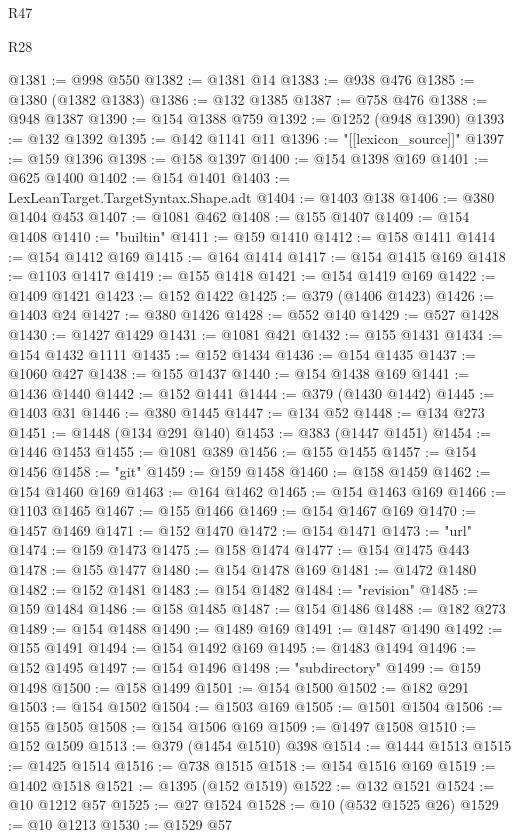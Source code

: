 \begin{lexlean}{R47}
\begin{lexlean}{R28}
\begin{coremodule}
{{{{{{{{{{{{{{{{{{{{{{{{{{{{{{{{{{{{{{{{{{{{{{{{{{{{{{{{{{{{{{{{{{{{{{{{{{{{{{{{{{{{{{{{{{{{{{{{{{{{{{{{{{{{{{{{{{{{{{{{{{{{{{{{{{{{{@1381 := @998 @550
@1382 := @1381 @14
@1383 := @938 @476
@1385 := @1380 (@1382 @1383)
@1386 := @132 @1385
@1387 := @758 @476
@1388 := @948 @1387
@1390 := @154 @1388 @759
@1392 := @1252 (@948 @1390)
@1393 := @132 @1392
@1395 := @142 @1141 @11
@1396 := "[[lexicon_source]]"
@1397 := @159 @1396
@1398 := @158 @1397
@1400 := @154 @1398 @169
@1401 := @625 @1400
@1402 := @154 @1401
@1403 := LexLeanTarget.TargetSyntax.Shape.adt
@1404 := @1403 @138
@1406 := @380 @1404 @453
@1407 := @1081 @462
@1408 := @155 @1407
@1409 := @154 @1408
@1410 := "builtin"
@1411 := @159 @1410
@1412 := @158 @1411
@1414 := @154 @1412 @169
@1415 := @164 @1414
@1417 := @154 @1415 @169
@1418 := @1103 @1417
@1419 := @155 @1418
@1421 := @154 @1419 @169
@1422 := @1409 @1421
@1423 := @152 @1422
@1425 := @379 (@1406 @1423)
@1426 := @1403 @24
@1427 := @380 @1426
@1428 := @552 @140
@1429 := @527 @1428
@1430 := @1427 @1429
@1431 := @1081 @421
@1432 := @155 @1431
@1434 := @154 @1432 @1111
@1435 := @152 @1434
@1436 := @154 @1435
@1437 := @1060 @427
@1438 := @155 @1437
@1440 := @154 @1438 @169
@1441 := @1436 @1440
@1442 := @152 @1441
@1444 := @379 (@1430 @1442)
@1445 := @1403 @31
@1446 := @380 @1445
@1447 := @134 @52
@1448 := @134 @273
@1451 := @1448 (@134 @291 @140)
@1453 := @383 (@1447 @1451)
@1454 := @1446 @1453
@1455 := @1081 @389
@1456 := @155 @1455
@1457 := @154 @1456
@1458 := "git"
@1459 := @159 @1458
@1460 := @158 @1459
@1462 := @154 @1460 @169
@1463 := @164 @1462
@1465 := @154 @1463 @169
@1466 := @1103 @1465
@1467 := @155 @1466
@1469 := @154 @1467 @169
@1470 := @1457 @1469
@1471 := @152 @1470
@1472 := @154 @1471
@1473 := "url"
@1474 := @159 @1473
@1475 := @158 @1474
@1477 := @154 @1475 @443
@1478 := @155 @1477
@1480 := @154 @1478 @169
@1481 := @1472 @1480
@1482 := @152 @1481
@1483 := @154 @1482
@1484 := "revision"
@1485 := @159 @1484
@1486 := @158 @1485
@1487 := @154 @1486
@1488 := @182 @273
@1489 := @154 @1488
@1490 := @1489 @169
@1491 := @1487 @1490
@1492 := @155 @1491
@1494 := @154 @1492 @169
@1495 := @1483 @1494
@1496 := @152 @1495
@1497 := @154 @1496
@1498 := "subdirectory"
@1499 := @159 @1498
@1500 := @158 @1499
@1501 := @154 @1500
@1502 := @182 @291
@1503 := @154 @1502
@1504 := @1503 @169
@1505 := @1501 @1504
@1506 := @155 @1505
@1508 := @154 @1506 @169
@1509 := @1497 @1508
@1510 := @152 @1509
@1513 := @379 (@1454 @1510) @398
@1514 := @1444 @1513
@1515 := @1425 @1514
@1516 := @738 @1515
@1518 := @154 @1516 @169
@1519 := @1402 @1518
@1521 := @1395 (@152 @1519)
@1522 := @132 @1521
@1524 := @10 @1212 @57
@1525 := @27 @1524
@1528 := @10 (@532 @1525 @26)
@1529 := @10 @1213
@1530 := @1529 @57
}}}}}}}}}}}}}}}}}}}}}}}}}}}}}}}}}}}}}}}}}}}}}}}}}}}}}}}}}}}}}}}}}}}}}}}}}}}}}}}}}}}}}}}}}}}}}}}}}}}}}}}}}}}}}}}}}}}}}}}}}}}}}}}}}}}}}
\end{coremodule}
\end{lexlean}
\end{lexlean}
